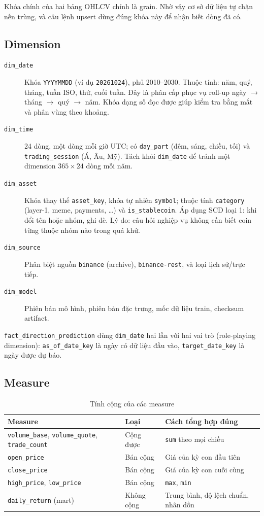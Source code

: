 \documentclass[11pt,a4paper]{article}
\newcommand{\code}[1]{\texttt{#1}}
\begin{document}
Khóa chính của hai bảng OHLCV chính là grain. Nhờ vậy cơ sở dữ liệu tự chặn nến trùng,
và câu lệnh upsert dùng đúng khóa này để nhận biết dòng đã có.

\subsection{Dimension}
\begin{description}
  \item[\code{dim\_date}] Khóa \code{YYYYMMDD} (ví dụ \code{20261024}), phủ 2010--2030. Thuộc tính:
    năm, quý, tháng, tuần ISO, thứ, cuối tuần. Đây là phân cấp phục vụ roll-up ngày $\rightarrow$
    tháng $\rightarrow$ quý $\rightarrow$ năm. Khóa dạng số đọc được giúp kiểm tra bằng mắt và
    phân vùng theo khoảng.
  \item[\code{dim\_time}] 24 dòng, một dòng mỗi giờ UTC; có \code{day\_part} (đêm, sáng, chiều, tối)
    và \code{trading\_session} (Á, Âu, Mỹ). Tách khỏi \code{dim\_date} để tránh một dimension
    $365 \times 24$ dòng mỗi năm.
  \item[\code{dim\_asset}] Khóa thay thế \code{asset\_key}, khóa tự nhiên \code{symbol}; thuộc tính
    \code{category} (layer-1, meme, payments, \ldots) và \code{is\_stablecoin}. Áp dụng SCD
    loại 1: khi đổi tên hoặc nhóm, ghi đè. Lý do: câu hỏi nghiệp vụ không cần biết coin từng
    thuộc nhóm nào trong quá khứ.
  \item[\code{dim\_source}] Phân biệt nguồn \code{binance} (archive), \code{binance-rest}, và loại lịch sử/trực tiếp.
  \item[\code{dim\_model}] Phiên bản mô hình, phiên bản đặc trưng, mốc dữ liệu train, checksum artifact.
\end{description}

\code{fact\_direction\_prediction} dùng \code{dim\_date} hai lần với hai vai trò
(role-playing dimension): \code{as\_of\_date\_key} là ngày có dữ liệu đầu vào,
\code{target\_date\_key} là ngày được dự báo.

\subsection{Measure}
\begin{table}[H]
\centering\small
\begin{tabularx}{\linewidth}{llX}
\toprule
\textbf{Measure} & \textbf{Loại} & \textbf{Cách tổng hợp đúng} \\
\midrule
\code{volume\_base}, \code{volume\_quote}, \code{trade\_count} & Cộng được & \code{sum} theo mọi chiều \\
\code{open\_price} & Bán cộng & Giá của kỳ con đầu tiên \\
\code{close\_price} & Bán cộng & Giá của kỳ con cuối cùng \\
\code{high\_price}, \code{low\_price} & Bán cộng & \code{max}, \code{min} \\
\code{daily\_return} (mart) & Không cộng & Trung bình, độ lệch chuẩn, nhân dồn \\
\bottomrule
\end{tabularx}
\caption{Tính cộng của các measure}
\end{table}
\end{document}
